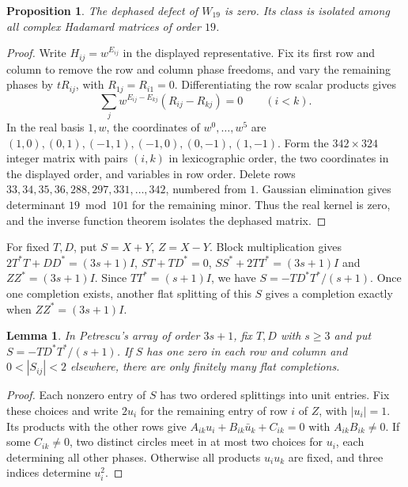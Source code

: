 \documentclass[11pt,a4paper]{article}
\newtheorem{proposition}[theorem]{Proposition}
\newtheorem{lemma}[theorem]{Lemma}
\numberwithin{equation}{section}
\begin{document}
\begin{proposition}\label{prime:w19-isolated}
The dephased defect of $W_{19}$ is zero. Its class is isolated among all complex Hadamard matrices of order $19$.
\end{proposition}
\begin{proof}
Write $H_{ij}=w^{E_{ij}}$ in the displayed representative. Fix its first row and column to remove the row and column phase freedoms, and vary the remaining phases by $tR_{ij}$, with $R_{1j}=R_{i1}=0$. Differentiating the row scalar products gives
$$\sum_j w^{E_{ij}-E_{kj}}(R_{ij}-R_{kj})=0\qquad(i<k).$$
In the real basis $1,w$, the coordinates of $w^0,\ldots,w^5$ are $(1,0),(0,1),(-1,1),(-1,0),(0,-1),(1,-1)$. Form the $342\times324$ integer matrix with pairs $(i,k)$ in lexicographic order, the two coordinates in the displayed order, and variables in row order. Delete rows $33,34,35,36,288,297,331,\ldots,342$, numbered from $1$. Gaussian elimination gives determinant $19\bmod101$ for the remaining minor. Thus the real kernel is zero, and the inverse function theorem isolates the dephased matrix.
\end{proof}

For fixed $T,D$, put $S=X+Y$, $Z=X-Y$. Block multiplication gives $2T^*T+DD^*=(3s+1)I$, $ST+TD^*=0$, $SS^*+2TT^*=(3s+1)I$ and $ZZ^*=(3s+1)I$. Since $TT^*=(s+1)I$, we have $S=-TD^*T^*/(s+1)$. Once one completion exists, another flat splitting of this $S$ gives a completion exactly when $ZZ^*=(3s+1)I$.

\begin{lemma}\label{prime:matching}
In Petrescu's array of order $3s+1$, fix $T,D$ with $s\ge3$ and put $S=-TD^*T^*/(s+1)$. If $S$ has one zero in each row and column and $0<|S_{ij}|<2$ elsewhere, there are only finitely many flat completions.
\end{lemma}
\begin{proof}
Each nonzero entry of $S$ has two ordered splittings into unit entries. Fix these choices and write $2u_i$ for the remaining entry of row $i$ of $Z$, with $|u_i|=1$. Its products with the other rows give $A_{ik}u_i+B_{ik}\bar u_k+C_{ik}=0$ with $A_{ik}B_{ik}\ne0$. If some $C_{ik}\ne0$, two distinct circles meet in at most two choices for $u_i$, each determining all other phases. Otherwise all products $u_i u_k$ are fixed, and three indices determine $u_i^2$.
\end{proof}
\end{document}
